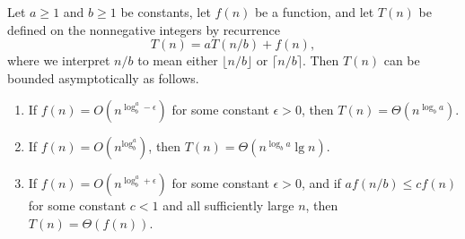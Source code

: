 \documentclass[12pt]{article}
\begin{document}
Let $a \ge 1$ and $b \ge 1$ be constants, let $f(n)$ be a function, and let $T(n)$ be defined on the nonnegative integers by recurrence
\begin{equation*}
  T(n) = aT(n/b) + f(n),
\end{equation*}
where we interpret $n/b$ to mean either $\lfloor n/b \rfloor$ or $\lceil n/b \rceil$. Then $T(n)$ can be bounded asymptotically as follows.
\begin{enumerate}
  \item If $f(n) = O(n^{\log_b^a - \epsilon})$ for some constant $\epsilon > 0$, then $T(n) = \Theta (n^{\log_b a})$.
  \item If $f(n) = O(n^{\log_b^a})$, then $T(n) = \Theta (n^{\log_b a} \lg n)$.
  \item If $f(n) = O(n^{\log_b^a + \epsilon})$ for some constant $\epsilon > 0$, and if $af(n/b) \le cf(n)$ for some constant $c < 1$ and all sufficiently large $n$, then $T(n) = \Theta \left( f(n) \right)$.
\end{enumerate}
\end{document}
